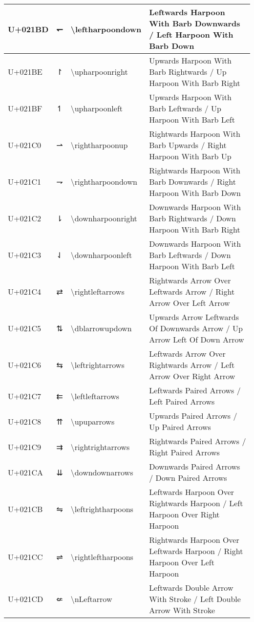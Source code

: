 \begin{table}[h]
\begin{tabulary}{\linewidth}{|L|L|L|L|}
\hline
U+021BD & ↽ & {\textbackslash}leftharpoondown & Leftwards Harpoon With Barb Downwards / Left Harpoon With Barb Down \\
\hline
U+021BE & ↾ & {\textbackslash}upharpoonright & Upwards Harpoon With Barb Rightwards / Up Harpoon With Barb Right \\
\hline
U+021BF & ↿ & {\textbackslash}upharpoonleft & Upwards Harpoon With Barb Leftwards / Up Harpoon With Barb Left \\
\hline
U+021C0 & ⇀ & {\textbackslash}rightharpoonup & Rightwards Harpoon With Barb Upwards / Right Harpoon With Barb Up \\
\hline
U+021C1 & ⇁ & {\textbackslash}rightharpoondown & Rightwards Harpoon With Barb Downwards / Right Harpoon With Barb Down \\
\hline
U+021C2 & ⇂ & {\textbackslash}downharpoonright & Downwards Harpoon With Barb Rightwards / Down Harpoon With Barb Right \\
\hline
U+021C3 & ⇃ & {\textbackslash}downharpoonleft & Downwards Harpoon With Barb Leftwards / Down Harpoon With Barb Left \\
\hline
U+021C4 & ⇄ & {\textbackslash}rightleftarrows & Rightwards Arrow Over Leftwards Arrow / Right Arrow Over Left Arrow \\
\hline
U+021C5 & ⇅ & {\textbackslash}dblarrowupdown & Upwards Arrow Leftwards Of Downwards Arrow / Up Arrow Left Of Down Arrow \\
\hline
U+021C6 & ⇆ & {\textbackslash}leftrightarrows & Leftwards Arrow Over Rightwards Arrow / Left Arrow Over Right Arrow \\
\hline
U+021C7 & ⇇ & {\textbackslash}leftleftarrows & Leftwards Paired Arrows / Left Paired Arrows \\
\hline
U+021C8 & ⇈ & {\textbackslash}upuparrows & Upwards Paired Arrows / Up Paired Arrows \\
\hline
U+021C9 & ⇉ & {\textbackslash}rightrightarrows & Rightwards Paired Arrows / Right Paired Arrows \\
\hline
U+021CA & ⇊ & {\textbackslash}downdownarrows & Downwards Paired Arrows / Down Paired Arrows \\
\hline
U+021CB & ⇋ & {\textbackslash}leftrightharpoons & Leftwards Harpoon Over Rightwards Harpoon / Left Harpoon Over Right Harpoon \\
\hline
U+021CC & ⇌ & {\textbackslash}rightleftharpoons & Rightwards Harpoon Over Leftwards Harpoon / Right Harpoon Over Left Harpoon \\
\hline
U+021CD & ⇍ & {\textbackslash}nLeftarrow & Leftwards Double Arrow With Stroke / Left Double Arrow With Stroke \\

\end{tabulary}
\end{table}
